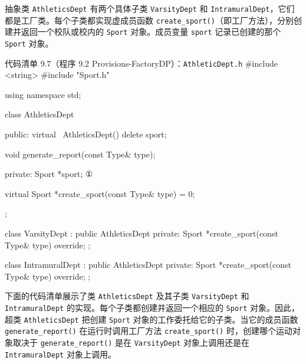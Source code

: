 
抽象类 \texttt{Athletics\allowbreak{}Dept} 有两个具体子类 \texttt{Varsity\allowbreak{}Dept} 和 \texttt{Intramural\allowbreak{}Dept}，它们都是工厂类。每个子类都实现虚成员函数 \texttt{create\_\allowbreak{}sport(\allowbreak{})\allowbreak{}}（即工厂方法），分别创建并返回一个校队或校内的 \texttt{Sport} 对象。成员变量 \texttt{sport} 记录已创建的那个 \texttt{Sport} 对象。

\begin{codeboxt}{代码清单 9.7（程序 9.2 Provisions-FactoryDP）：\texttt{Athletic\allowbreak{}Dept.\allowbreak{}h}}
#include <string>
#include "Sport.h"

using namespace std;

class AthleticsDept
{
public:
    virtual ~AthleticsDept() { delete sport; }

    void generate_report(const Type& type);

private:
    Sport *sport;                ①

    virtual Sport *create_sport(const Type& type) = 0;
};

class VarsityDept : public AthleticsDept
{
private:
    Sport *create_sport(const Type& type) override;
};

class IntramuralDept : public AthleticsDept
{
private:
    Sport *create_sport(const Type& type) override;
};
\end{codeboxt}
\par

下面的代码清单展示了类 \texttt{Athletics\allowbreak{}Dept} 及其子类 \texttt{Varsity\allowbreak{}Dept} 和 \texttt{Intramural\allowbreak{}Dept} 的实现。每个子类都创建并返回一个相应的 \texttt{Sport} 对象。因此，超类 \texttt{Athletics\allowbreak{}Dept} 把创建 \texttt{Sport} 对象的工作委托给它的子类。当它的成员函数 \texttt{generate\_\allowbreak{}report(\allowbreak{})\allowbreak{}} 在运行时调用工厂方法 \texttt{create\_\allowbreak{}sport(\allowbreak{})\allowbreak{}} 时，创建哪个运动对象取决于 \texttt{generate\_\allowbreak{}report(\allowbreak{})\allowbreak{}} 是在 \texttt{Varsity\allowbreak{}Dept} 对象上调用还是在 \texttt{Intramural\allowbreak{}Dept} 对象上调用。

